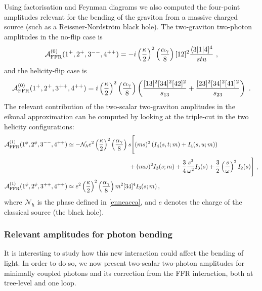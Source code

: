 \documentclass[a4paper,11pt]{article}
\numberwithin{equation}{section}
\newcommand{\sqr}[2]{\lbrack #1 #2 \rbrack}
\newcommand{\cA}{\mathcal{A}}
\newcommand{\cN}{\mathcal{N}}
\def\cA{\mathcal{A}}
\begin{document}
Using factorisation and Feynman diagrams we also computed the four-point amplitudes relevant for the bending of the graviton from a massive charged source (such as a Reissner-Nordstr\"{o}m black hole). The two-graviton two-photon amplitudes in the no-flip case is
\begin{equation}
    \cA^{(0)}_{\rm FFR} (1^+ , 2^+ , 3^{--} , 4^{++}) = - i \left(\frac{\kappa}{2}\right)^2 \left(\frac{\alpha_\gamma}{8}\right) \sqr{1}{2}^2 \frac{\langle 3 | 1 | 4 \rbrack^4}{s t u}\ ,
\end{equation}
and the helicity-flip case is
\begin{equation}
    \cA^{(0)}_{\rm FFR} (1^+ , 2^+ , 3^{++} , 4^{++}) = i \left(\frac{\kappa}{2}\right)^2 \left(\frac{\alpha_\gamma}{8}\right) \left(\frac{\sqr{1}{3}^2 \sqr{3}{4}^2 \sqr{4}{2}^2}{s_{1 3}} + \frac{\sqr{2}{3}^2 \sqr{3}{4}^2 \sqr{4}{1}^2}{s_{2 3}} \right)\ .
\end{equation}
%
The relevant contribution of the two-scalar two-graviton amplitudes in the eikonal approximation can be computed by looking at the triple-cut in the two helicity configurations:
\begin{equation}\label{eq:FFR1loop}
    \begin{split}
        \cA^{(1)}_{\rm FFR} (1^\phi , 2^\phi , 3^{--} , 4^{++}) &\simeq - \cN_{h} e^2 \left(\frac{\kappa}{2}\right)^2 \left(\frac{\alpha_\gamma}{8}\right) s \Bigg[(m s)^2 \left(I_4 (s, t;m) + I_4 (s, u;m) \right)\\[.2em]
        & \hspace{10em}+ (m \omega)^2 I_3 (s;m) + \frac{3}{4}\frac{s^3}{\omega^2} I_3(s)+ \frac{3}{2}\left(\frac{s}{\omega}\right)^2 I_2(s) \Bigg]\ ,\\[.2em]
        \cA^{(1)}_{\rm FFR} (1^\phi , 2^\phi , 3^{++} , 4^{++}) &\simeq e^2 \left(\frac{\kappa}{2}\right)^2 \left(\frac{\alpha_\gamma}{8}\right) m^2 \sqr{3}{4}^4 I_3 (s;m) \, ,
    \end{split}
\end{equation}
where $\mathcal{N}_h$ is the phase defined in \eqref{enneacca}, and  $e$ denotes the charge of the classical source (the black hole).

\subsubsection{Relevant amplitudes for photon bending}

It is  interesting to study how this new interaction could affect the bending of light. In order to do so, we now present two-scalar two-photon amplitudes for minimally coupled photons and its correction from the FFR interaction, both at tree-level and one loop.
\end{document}
